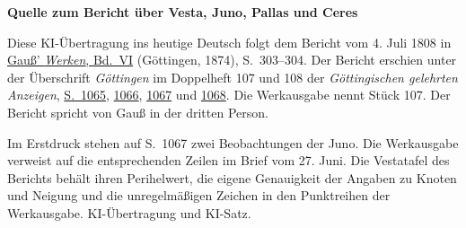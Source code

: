 \clearpage\thispagestyle{empty}
\begin{center}\textbf{Quelle zum Bericht über Vesta, Juno, Pallas und Ceres}\end{center}
\noindent Diese KI-Übertragung ins heutige Deutsch folgt dem Bericht vom 4. Juli 1808 in \href{https://gdz.sub.uni-goettingen.de/id/PPN236007467}{Gauß’ \textit{Werken}, Bd.~VI} (Göttingen, 1874), S.~303--304. Der Bericht erschien unter der Überschrift \textit{Göttingen} im Doppelheft 107 und 108 der \textit{Göttingischen gelehrten Anzeigen}, \href{https://manifests.sub.uni-goettingen.de/iiif/image/gdz:PPN319721507_1808:00001071/full/1600,/0/default.jpg}{S.~1065}, \href{https://manifests.sub.uni-goettingen.de/iiif/image/gdz:PPN319721507_1808:00001072/full/1600,/0/default.jpg}{1066}, \href{https://manifests.sub.uni-goettingen.de/iiif/image/gdz:PPN319721507_1808:00001073/full/1600,/0/default.jpg}{1067} und \href{https://manifests.sub.uni-goettingen.de/iiif/image/gdz:PPN319721507_1808:00001074/full/1600,/0/default.jpg}{1068}. Die Werkausgabe nennt Stück 107. Der Bericht spricht von Gauß in der dritten Person.
\par\medskip
Im Erstdruck stehen auf S.~1067 zwei Beobachtungen der Juno. Die Werkausgabe verweist auf die entsprechenden Zeilen im Brief vom 27. Juni. Die Vestatafel des Berichts behält ihren Perihelwert, die eigene Genauigkeit der Angaben zu Knoten und Neigung und die unregelmäßigen Zeichen in den Punktreihen der Werkausgabe. KI-Übertragung und KI-Satz.
\clearpage
